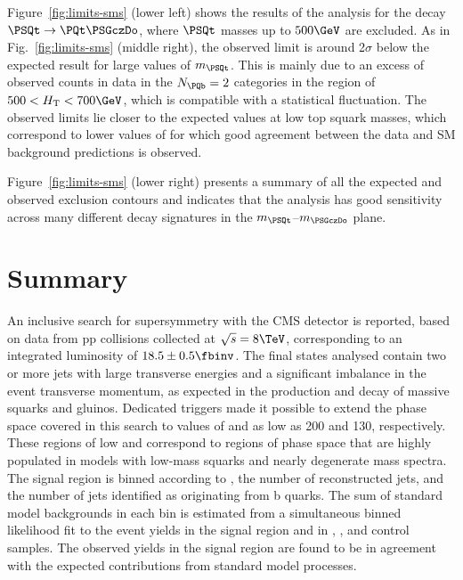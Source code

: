 Figure~\ref{fig:limits-sms} (lower left) shows the results of the
analysis for the decay $\PSQt \to \PQt \PSGczDo$,
where $\PSQt$ masses up to $500 \GeV$ are excluded.  As in
Fig.~\ref{fig:limits-sms} (middle right), the observed limit is around
2$\sigma$ below the expected result for large values of
$m_{\PSQt}$. This is mainly due to an excess of observed counts in
data in the $\nb=2$ categories in the region of $500 < \scalht < 700
\GeV$, which is compatible with a statistical fluctuation.  The
observed limits lie closer to the expected values at low top squark
masses, which correspond to lower values of \scalht for which good
agreement between the data and SM background predictions is observed.

Figure~\ref{fig:limits-sms} (lower right) presents a summary of all
the expected and observed exclusion contours and indicates that the
analysis has good sensitivity across many different decay signatures
in the $m_{\PSQt}$--$m_{\PSGczDo}$ plane.

\section{Summary}

An inclusive search for supersymmetry with the CMS detector is
reported, based on data from pp collisions collected at $\sqrt{s} =
8\TeV$, corresponding to an integrated luminosity of $18.5 \pm 0.5
\fbinv$. The final states analysed contain two or more jets with large
transverse energies and a significant imbalance in the event
transverse momentum, as expected in the production and decay of
massive squarks and gluinos. Dedicated triggers made it possible to
extend the phase space covered in this search to values of \scalht and
\HTmiss as low as 200 and 130\GeV, respectively.  These regions of low
\scalht and \HTmiss correspond to regions of phase space that are
highly populated in models with low-mass squarks and nearly degenerate
mass spectra. The signal region is binned according to \scalht, the
number of reconstructed jets, and the number of jets identified as
originating from b quarks. The sum of standard model backgrounds in
each bin is estimated from a simultaneous binned likelihood fit to the
event yields in the signal region and in \mj, \mmj, and \gj control
samples. The observed yields in the signal region are found to be in
agreement with the expected contributions from standard model
processes.

